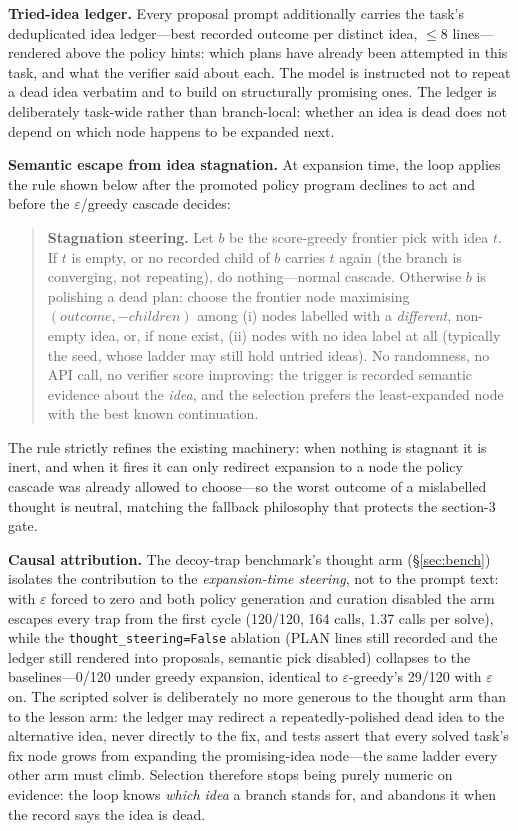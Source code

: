 \documentclass[11pt,a4paper]{article}
\newcommand{\hdr}[1]{\textbf{#1}}
\begin{document}
\hdr{Tried-idea ledger.} Every proposal prompt additionally carries the
task's deduplicated idea ledger---best recorded outcome per distinct idea,
$\leq$8 lines---rendered above the policy hints: which plans have already
been attempted in this task, and what the verifier said about each. The
model is instructed not to repeat a dead idea verbatim and to build on
structurally promising ones. The ledger is deliberately task-wide rather
than branch-local: whether an idea is dead does not depend on which node
happens to be expanded next.

\hdr{Semantic escape from idea stagnation.} At expansion time, the loop
applies the rule shown below after the promoted policy program declines to
act and before the $\varepsilon$/greedy cascade decides:

\begin{quote}\small\begin{minipage}{0.94\linewidth}
\textbf{Stagnation steering.} Let $b$ be the score-greedy frontier pick with
idea $t$. If $t$ is empty, or no recorded child of $b$ carries $t$ again
(the branch is converging, not repeating), do nothing---normal cascade.
Otherwise $b$ is polishing a dead plan: choose the frontier node
maximising $(\mathit{outcome}, -\mathit{children})$ among (i) nodes labelled
with a \emph{different}, non-empty idea, or, if none exist, (ii) nodes with
no idea label at all (typically the seed, whose ladder may still hold
untried ideas). No randomness, no API call, no verifier score improving:
the trigger is recorded semantic evidence about the \emph{idea}, and the
selection prefers the least-expanded node with the best known continuation.
\end{minipage}\end{quote}

The rule strictly refines the existing machinery: when nothing is stagnant
it is inert, and when it fires it can only redirect expansion to a node the
policy cascade was already allowed to choose---so the worst outcome of a
mislabelled thought is neutral, matching the fallback philosophy that
protects the section-3 gate.

\hdr{Causal attribution.} The decoy-trap benchmark's thought arm
(\S\ref{sec:bench}) isolates the contribution to the \emph{expansion-time
steering}, not to the prompt text: with $\varepsilon$ forced to zero and
both policy generation and curation disabled the arm escapes every trap
from the first cycle (120/120, 164 calls, 1.37 calls per solve), while the
\texttt{thought\_steering=False} ablation (PLAN lines still recorded and the
ledger still rendered into proposals, semantic pick disabled) collapses to
the baselines---0/120 under greedy expansion, identical to
$\varepsilon$-greedy's 29/120 with $\varepsilon$ on. The scripted solver is
deliberately no more generous to the thought arm than to the lesson arm:
the ledger may redirect a repeatedly-polished dead idea to the alternative
idea, never directly to the fix, and tests assert that every solved task's
fix node grows from expanding the promising-idea node---the same ladder
every other arm must climb. Selection therefore stops being purely numeric
on evidence: the loop knows \emph{which idea} a branch stands for, and
abandons it when the record says the idea is dead.
\end{document}
